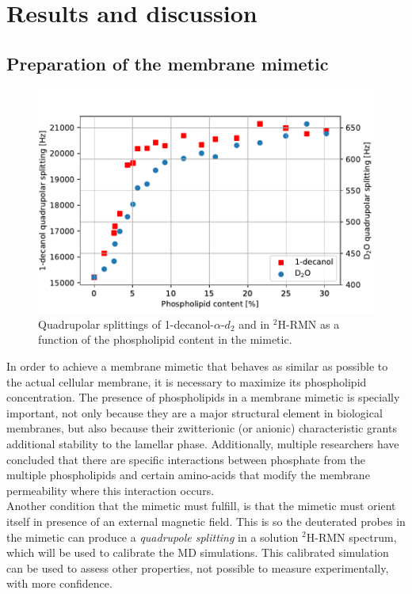 \documentclass[3p,preprint,review]{elsarticle}
\begin{document}
	\section{Results and discussion}
	
	\subsection{Preparation of the membrane mimetic}
	
	\begin{figure}[h]
		\centering
		\includegraphics[width=\columnwidth]{splitting_v_phospholipid}
		\caption{Quadrupolar splittings of 1-decanol-$\alpha$-$d_2$ and  in
			$^2$H-RMN as a function of the phospholipid content in the mimetic.}
		\label{fig:1st_max}
	\end{figure}
	
	In order to achieve a membrane mimetic that behaves as similar as possible to
  the actual cellular membrane, it is necessary to maximize its phospholipid
  concentration. The presence of phospholipids in a membrane mimetic is
  specially important, not only because they are a major structural element in
  biological membranes, but also because their zwitterionic (or anionic)
  characteristic grants additional stability to the lamellar phase.
  Additionally, multiple researchers have concluded that there are
  specific interactions between phosphate from the multiple phospholipids and
  certain amino-acids that modify the membrane
	permeability where this interaction occurs\cite{Aliaga2011,Hristova2011}.\\
  
	Another condition that the mimetic must fulfill, is that the mimetic must
  orient itself in presence of an external magnetic field. This is so the
  deuterated probes in the mimetic can produce a \textit{quadrupole splitting}
  in a solution $^2$H-RMN spectrum, which will be used to calibrate the MD
  simulations. This calibrated simulation can be used to assess other
  properties, not possible to measure experimentally, with more
	confidence.\\
	
\end{document}

